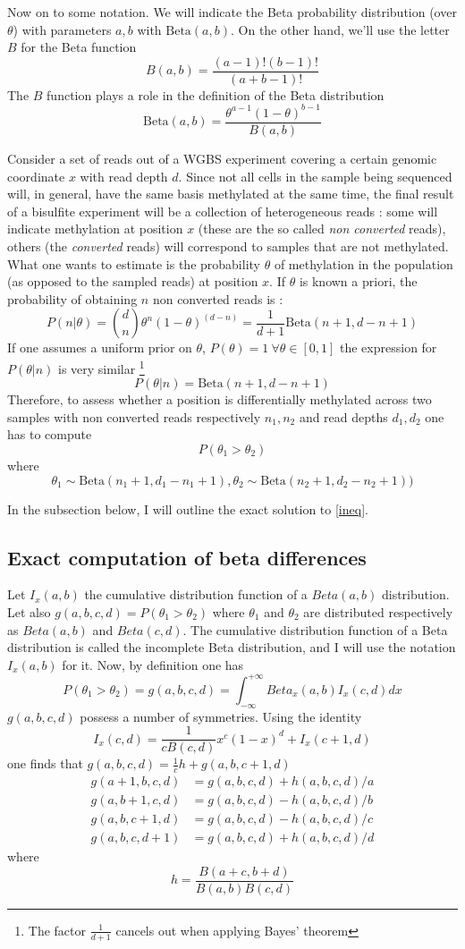 \documentclass[11pt]{amsart}
\begin{document}
Now on to some notation. We will indicate the Beta probability distribution (over $\theta$) with parameters $a,b$ with $\mbox{Beta}(a,b)$. On the other hand, we'll use the letter $B$ for the Beta function 
\[B(a,b)=\frac{(a-1)!(b-1)!}{(a+b-1)!}\] The $B$ function plays a role in the definition of the Beta distribution \[\mbox{Beta}(a,b)=\frac{\theta^{a-1}(1-\theta)^{b-1}}{B(a,b)}\]
 
Consider a set of reads out of a WGBS experiment covering a certain genomic coordinate $x$ with read depth $d$. Since not all cells in the sample being sequenced will, in general,  have the same basis methylated at the same time, the final result of a bisulfite experiment will be a collection of heterogeneous reads : some will indicate methylation at position $x$ (these are the so called {\em non converted} reads), others (the {\em converted} reads) will correspond to samples that are not methylated. What one wants to estimate is the probability $\theta$ of methylation in the population (as opposed to the sampled reads) at position $x$.  If $\theta$ is known a priori, the probability of obtaining $n$ non converted reads is :
\[P(n|\theta)={d \choose n}\theta^n ({1-\theta})^{(d-n)}=\frac{1}{d+1}\mbox{Beta}(n+1,d-n+1)\]
If one assumes a uniform prior on $\theta$, $P(\theta)=1 \ \forall \theta \in [0,1]$ the expression for $P(\theta|n)$ is very similar \footnote{The factor $\frac{1}{d+1}$ cancels out when applying Bayes' theorem}
\[P(\theta|n)=\mbox{Beta}(n+1,d-n+1)\]
Therefore, to assess whether a position is differentially methylated across two samples with non converted reads respectively $n_1,n_2$ and read depths $d_1,d_2$ one
has to compute 
\[P(\theta_1>\theta_2) \] where 
\[ \theta_1 \sim \mbox{Beta}(n_1+1,d_1-n_1+1) , \theta_2 \sim \mbox{Beta}(n_2+1,d_2-n_2+1))\]\label{ineq}

In the subsection below, I will outline the exact solution to \ref{ineq}.
 
\subsection{Exact computation of beta differences}
Let $I_x(a,b)$ the cumulative distribution function of a $Beta(a,b)$ distribution. Let also $g(a,b,c,d)=P(\theta_1>\theta_2)$ where $\theta_1$ and $\theta_2$ are distributed respectively as $Beta(a,b)$ and $Beta(c,d)$. The cumulative distribution function of a Beta distribution is called the incomplete Beta distribution, and I will use the notation $I_x(a,b)$ for it. Now, by definition one has \[P(\theta_1>\theta_2)=g(a,b,c,d)=\int_{-\infty}^{+\infty} Beta_x(a,b)I_x(c,d) dx\]
$g(a,b,c,d)$ possess a number of symmetries.
Using the identity \[I_x(c,d)=\frac{1}{cB(c,d)}x^c(1-x)^d+I_x(c+1,d)\] one finds that 
$g(a,b,c,d)=\frac{1}{c}h+g(a,b,c+1,d)$
\begin{align}
g(a + 1,b,c,d) &= g(a,b,c,d) + h(a,b,c,d)/a \\
g(a,b+1,c,d) &= g(a,b,c,d) - h(a,b,c,d)/b \\
g(a,b,c+1,d) &= g(a,b,c,d) - h(a,b,c,d)/c \\
g(a,b,c,d+1) &= g(a,b,c,d) + h(a,b,c,d)/d 
\end{align}
where \[h=\frac{B(a+c,b+d)}{B(a,b)B(c,d)}\]
\end{document}
